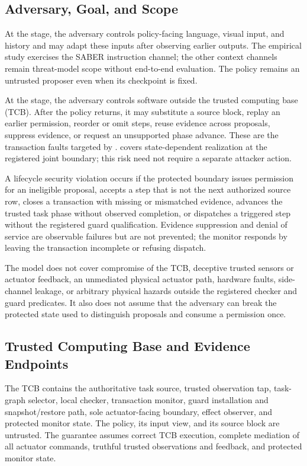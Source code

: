 \subsection{Adversary, Goal, and Scope}

At the \intentaction stage, the adversary controls policy-facing language,
visual input, and history and may adapt these inputs after observing earlier
outputs.  The empirical study exercises the SABER instruction channel; the
other context channels remain threat-model scope without end-to-end evaluation.
The policy remains an untrusted proposer even when its checkpoint is fixed.

At the \actionexecution stage, the adversary controls software outside the
trusted computing base (TCB).  After the policy returns, it may substitute a
source block, replay an earlier permission, reorder or omit steps, reuse
evidence across proposals, suppress evidence, or request an unsupported phase
advance.  These are the transaction faults targeted by \ltwoa.  \ltwob covers
state-dependent realization at the registered joint boundary; this risk need
not require a separate attacker action.

A lifecycle security violation occurs if the protected boundary issues
permission for an
ineligible proposal, accepts a step that is not the next authorized source row,
closes a transaction with missing or mismatched evidence, advances the trusted
task phase without observed completion, or dispatches a triggered step without
the registered guard qualification.  Evidence suppression and denial of service
are observable failures but are not prevented; the monitor responds by leaving
the transaction incomplete or refusing dispatch.

The model does not cover compromise of the TCB, deceptive trusted sensors or
actuator feedback, an unmediated physical actuator path, hardware faults,
side-channel leakage, or arbitrary physical hazards outside the registered
checker and guard predicates.  It also does not assume that the adversary can
break the protected state used to distinguish proposals and consume a
permission once.

\subsection{Trusted Computing Base and Evidence Endpoints}

The TCB contains the authoritative task source, trusted observation tap,
task-graph selector, local checker, transaction monitor, guard installation and
snapshot/restore path, sole actuator-facing boundary, effect observer, and
protected monitor state.  The policy, its input view, and its source block are
untrusted.  The guarantee assumes correct TCB execution, complete mediation of
all actuator commands, truthful trusted observations and feedback, and protected
monitor state.

